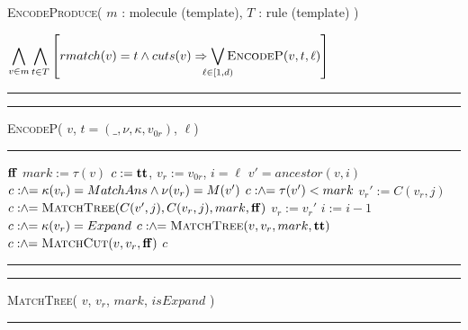 \begin{algorithm}[h!]
  \caption{\textsc{EncodeProduce}( $m$ : molecule (template), $T$ : rule (template) )}
  \label{alg:produce}
  \begin{algorithmic}[1]
    \State \Return $\displaystyle
    \Land_{v\in m}
    \Land_{t \in T}
    \left[
      rmatch(v) = t \land cuts(v) \limplies \Lor_{ \mathclap{\ell \in [1,d)}} \textsc{EncodeP}( v, t, \ell)
      \right]
      $
  \end{algorithmic}
  \hrule
  \vspace{2ex}
  \hrule\vspace{2pt}
  \textsc{EncodeP}( $v$, $t = (\_,\nu,\kappa,v_{0r})$, $\ell$)\hfill\mbox{}
  \vspace{2pt}\hrule
  \begin{algorithmic}[1]
     \quad \Return $\mathbf{ff}$
    \EndIf
    \State $mark := \tau(v)$
    \State $c := \mathbf{tt}$, \; $v_r := v_{0r}$, \; $i = \ell$
    \label{line:encodep-while}
    \State $v' = ancestor(v,i)$
    \State $c \mathrel{:\hspace{-3pt}\land\hspace{-3pt}=}  \kappa(v_r) = MatchAns \land \nu(v_r) = M(v') $
    \label{line:encodep-ans-match}
    \State $c \mathrel{:\hspace{-3pt}\land\hspace{-3pt}=} \tau(v') < mark$
    \label{line:encodep-ans-order}
    \label{line:encodep-sub-for-loop}
       \label{line:encodep-jth-child-cond}
       \State $v_r' := C(v_r, j)$ 
       \label{line:encodep-next-vr}
    \Else
       \State $c \mathrel{:\hspace{-3pt}\land\hspace{-3pt}=} \textsc{MatchTree}(C(v',j), C(v_r, j),mark, \mathbf{ff})$
       \label{line:mtree}
    \EndIf
    \EndFor
    \State $v_r := v_r'$
    \label{line:encodep-update-vr}
    \State $i := i - 1$
    \EndWhile
    \label{line:encodep-end-whileloop}
    \State $c \mathrel{:\hspace{-3pt}\land\hspace{-3pt}=}  \kappa(v_r) = Expand$
    \label{line:encodep-vr-expand}
    \State $c \mathrel{:\hspace{-3pt}\land\hspace{-3pt}=}  \textsc{MatchTree}(v, v_r,mark,\mathbf{tt}) $
    \label{line:encodep-mtree-expand}
    \State $c \mathrel{:\hspace{-3pt}\land\hspace{-3pt}=}  \textsc{MatchCut}(v, v_r,\mathbf{ff})
    $\label{line:mcut}
    \State \Return $c$
  \end{algorithmic}
  \hrule
  \vspace{2ex}
  \hrule\vspace{2pt}
  \textsc{MatchTree}( $v$, $v_r$, $mark$, $isExpand$ )\hfill\mbox{}
  \vspace{2pt}\hrule
  \begin{algorithmic}[1]

\end{algorithmic}
\end{algorithm}
